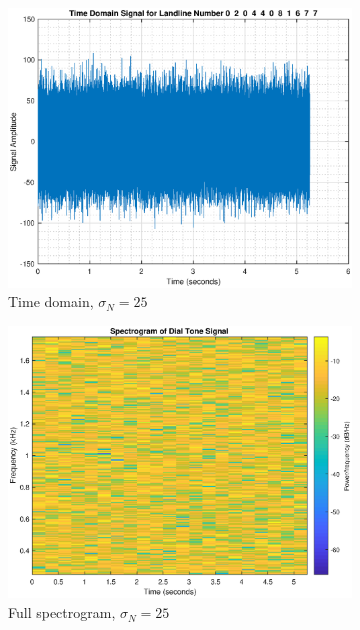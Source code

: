 \documentclass{article}
\begin{document}
\begin{figure}[h!]
\begin{subfigure}{0.32\textwidth}
\includegraphics[width = \textwidth]{dtp_fullsig_n25}
\caption{Time domain, $\sigma_N=25$}
\label{fig:dtp_fullsig_n25}
\end{subfigure}
\begin{subfigure}{0.32\textwidth}
\centering
\includegraphics[width = \textwidth]{dtp_spec_n25}
\caption{Full spectrogram, $\sigma_N=25$}
\label{fig:dtp_spec_n25}
\end{subfigure}
\begin{subfigure}{0.32\textwidth}
\centering

\end{subfigure}
\end{figure}
\end{document}
